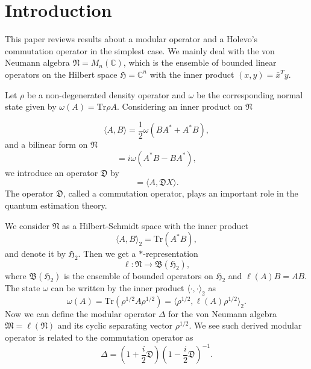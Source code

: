 \section{Introduction}
This paper reviews results about a modular operator \cite{Longo_1978} and a Holevo's commutation operator \cite{Holevo_1977} in the simplest case.
We mainly deal with the von Neumann algebra $\mathfrak{N}=M_n(\mathbb{C})$, 
which is the ensemble of bounded linear operators on 
the Hilbert space $\mathfrak{H}=\mathbb{C}^n$ with the inner product $(x,y)=\bar{x}^Ty$. 

Let $\rho$ be a non-degenerated density operator and 
$\omega$ be the corresponding normal state given by $\omega(A)=\mbox{Tr}\rho A$.
Considering an inner product on $\mathfrak{N}$

\begin{equation}
\label{innerP}
\langle A, B \rangle =\frac{1}{2}\omega(BA^{\ast}+A^{\ast}B),
\end{equation}
and a bilinear form on $\mathfrak{N}$
\begin{equation}
[A,B]=i\omega(A^{\ast}B-BA^{\ast}),
\end{equation}
we introduce an operator $\mathfrak{D}$ by 
\begin{equation}
[A,X]=\langle A, \mathfrak{D}X\rangle.
\end{equation}
The operator $\mathfrak{D}$, called a commutation operator, plays an important role in the quantum estimation theory.

We consider $\mathfrak{N}$ as a Hilbert-Schmidt space with the inner product
$$
\langle A, B \rangle_2 =\mbox{Tr}(A^{\ast}B),
$$
and denote it by $\mathfrak{H}_2$.
Then we get a $\ast$-representation 
$$
\ell :\mathfrak{N}\to \mathfrak{B}(\mathfrak{H}_2),
$$
where $\mathfrak{B}(\mathfrak{H}_2)$ is the ensemble of bounded operators on $\mathfrak{H}_2$
and $\ell(A)B=AB$.
The state $\omega$ can be written by the inner product $\langle \cdot, \cdot\rangle_2$ as 
$$
\omega(A)=\mbox{Tr}(\rho^{1/2}A\rho^{1/2})=\langle \rho^{1/2},\ell(A)\rho^{1/2}\rangle_2 .
$$
Now we can define the modular operator $\Delta$ for the von Neumann algebra $\mathfrak{M}=\ell(\mathfrak{N})$ and its cyclic separating vector $\rho^{1/2}$. 
We see such derived modular operator is related to the commutation operator
as
$$
    \Delta=\left(1+\frac{i}{2}\mathfrak{D}\right)\left(1-\frac{i}{2}\mathfrak{D}\right)^{-1}.
$$

